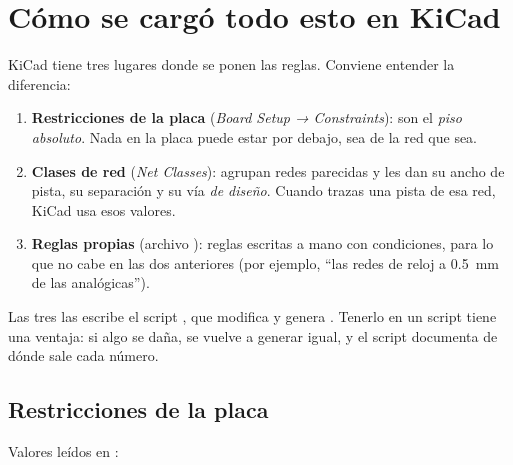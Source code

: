 \section{Cómo se cargó todo esto en KiCad}\label{sec:c06-kicad}

KiCad tiene tres lugares donde se ponen las reglas. Conviene entender la diferencia:

\begin{enumerate}
  \item \textbf{Restricciones de la placa} (\emph{Board Setup → Constraints}): son el \emph{piso absoluto}. Nada en
        la placa puede estar por debajo, sea de la red que sea.
  \item \textbf{Clases de red} (\emph{Net Classes}): agrupan redes parecidas y les dan su ancho de pista, su
        separación y su vía \emph{de diseño}. Cuando trazas una pista de esa red, KiCad usa esos valores.
  \item \textbf{Reglas propias} (archivo ): reglas escritas a mano con condiciones, para lo
        que no cabe en las dos anteriores (por ejemplo, ``las redes de reloj a \SI{0.5}{\milli\meter} de las
        analógicas'').
\end{enumerate}

Las tres las escribe el script , que modifica  y genera
. Tenerlo en un script tiene una ventaja: si algo se daña, se vuelve a generar igual, y el
script documenta de dónde sale cada número.

\subsection{Restricciones de la placa}
Valores leídos en  \medido:

